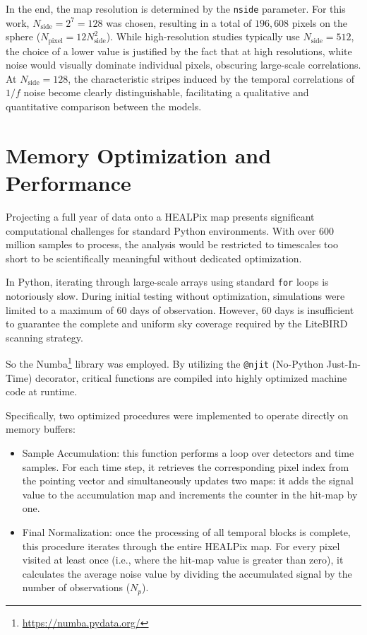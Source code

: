 In the end, the map resolution is determined by the \texttt{nside} parameter. For this work, $N_{\text{side}} = 2^7 = 128$ was chosen, resulting in a total of $196,608$ pixels on the sphere ($N_{\text{pixel}} = 12N_{\text{side}}^2$). While high-resolution studies typically use $N_{\text{side}} = 512$, the choice of a lower value is justified by the fact that at high resolutions, white noise would visually dominate individual pixels, obscuring large-scale correlations. At $N_{\text{side}} = 128$, the characteristic stripes induced by the temporal correlations of $1/f$ noise become clearly distinguishable, facilitating a qualitative and quantitative comparison between the models.




\section{Memory Optimization and Performance}

Projecting a full year of data onto a HEALPix map presents significant computational challenges for standard Python environments. With over 600 million samples to process, the analysis would be restricted to timescales too short to be scientifically meaningful without dedicated optimization.

In Python, iterating through large-scale arrays using standard \texttt{for} loops is notoriously slow. During initial testing without optimization, simulations were limited to a maximum of 60 days of observation. However, 60 days is insufficient to guarantee the complete and uniform sky coverage required by the LiteBIRD scanning strategy.

So the Numba\footnote{\url{https://numba.pydata.org/}} library was employed. By utilizing the \texttt{@njit} (No-Python Just-In-Time) decorator, critical functions are compiled into highly optimized machine code at runtime.

Specifically, two optimized procedures were implemented to operate directly on memory buffers:
\begin{itemize}
    \item Sample Accumulation: this function performs a loop over detectors and time samples. For each time step, it retrieves the corresponding pixel index from the pointing vector and simultaneously updates two maps: it adds the signal value to the accumulation map and increments the counter in the hit-map by one.
    \item Final Normalization: once the processing of all temporal blocks is complete, this procedure iterates through the entire HEALPix map. For every pixel visited at least once (i.e., where the hit-map value is greater than zero), it calculates the average noise value by dividing the accumulated signal by the number of observations ($N_p$).
\end{itemize}

